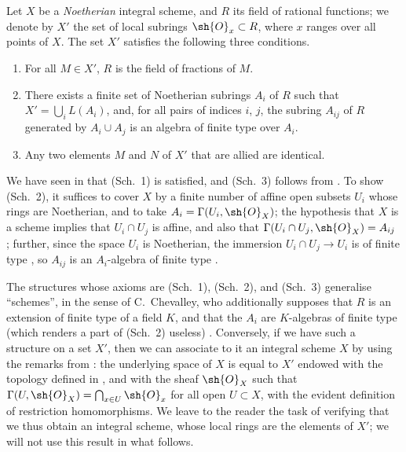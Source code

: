 \begin{env}[8.3.1]
\label{I.8.3.1}
Let $X$ be a \emph{Noetherian} integral scheme, and $R$ its field of rational functions;
we denote by $X'$ the set of local subrings $\sh{O}_x\subset R$, where $x$ ranges over all points of $X$.
The set $X'$ satisfies the following three conditions.
\begin{enumerate}
  \item[(Sch.~1)] For all $M\in X'$, $R$ is the field of fractions of $M$.
  \item[(Sch.~2)] There exists a finite set of Noetherian subrings $A_i$ of $R$ such that $X'=\bigcup_i L(A_i)$, and, for all pairs of indices $i$, $j$, the subring $A_{ij}$ of $R$ generated by $A_i\cup A_j$ is an algebra of finite type over $A_i$.
  \item[(Sch.~3)] Any two elements $M$ and $N$ of $X'$ that are allied are identical.
\end{enumerate}
\end{env}

We have seen in  that (Sch.~1) is satisfied, and (Sch.~3) follows from .
To show (Sch.~2), it suffices to cover $X$ by a finite number of affine open subsets $U_i$ whose rings are Noetherian, and to take $A_i=\Gamma(U_i,\sh{O}_X)$;
the hypothesis that $X$ is a scheme implies that $U_i\cap U_j$ is affine, and also that $\Gamma(U_i\cap U_j,\sh{O}_X)=A_{ij}$ ;
further, since the space $U_i$ is Noetherian, the immersion $U_i\cap U_j\to U_i$ is of finite type , so $A_{ij}$ is an $A_i$-algebra of finite type .

\begin{env}[8.3.2]
\label{I.8.3.2}
The structures whose axioms are (Sch.~1), (Sch.~2), and (Sch.~3) generalise ``schemes'', in the sense of C.~Chevalley, who additionally supposes that $R$ is an extension of finite type of a field $K$, and that the $A_i$ are $K$-algebras of finite type (which renders a part of (Sch.~2) useless) \cite{I-1}.
Conversely, if we have such a structure on a set $X'$, then we can associate to it an integral scheme $X$ by using the remarks from : the underlying space of $X$ is equal to $X'$ endowed with the topology defined in , and with the sheaf $\sh{O}_X$ such that $\Gamma(U,\sh{O}_X)=\bigcap_{x\in U}\sh{O}_x$ for all open $U\subset X$, with the evident definition of restriction homomorphisms.
We leave to the reader the task of verifying that we thus obtain an integral scheme, whose local rings are the elements of $X'$;
we will not use this result in what follows.
\end{env}
